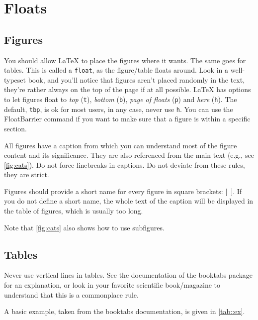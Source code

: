 \documentclass[{{cookiecutter.project_slug}}.tex]{subfiles}
\begin{document}
    \section{Floats}
    \subsection{Figures}
    You should  allow \LaTeX{} to place  the figures where it  wants.  The 
    same  goes  for  tables.   This  is  called  a  \verb+float+,  as  the 
    figure/table floats around.   Look in a well-typeset  book, and you'll 
    notice that figures aren't placed randomly in the text, they're rather 
    always  on the  top  of  the page  if  at  all possible. \LaTeX{}  has 
    options to  let figures float to  \emph{top} (\verb+t+), \emph{bottom} 
    (\verb+b+),   \emph{page  of   floats}   (\verb+p+)  and   \emph{here} 
    (\verb+h+).  The  default, \verb+tbp+, is  ok for most users,  in any 
    case, never use \verb+h+.  You can use the FloatBarrier command if you 
    want to make sure that a figure is within a specific section.          

    All figures have  a caption from which you can  understand most of the 
    figure content  and its significance.   They are also  referenced from 
    the main text (e.g., see \cref{fig:cats}).  Do not force linebreaks in 
    captions.  Do not deviate from these rules, they are strict.           

    Figures  should  provide a  short  name  for  every figure  in  square 
    brackets: $[$~$]$. If  you do not define a short  name, the whole text 
    of the caption will be displayed in the table of figures, which is 
    usually too long.
    
    Note that \cref{fig:cats} also shows how to use subfigures.



    \subsection{Tables}
    Never  use vertical  lines in  tables.  See  the documentation  of the 
    booktabs  package  for  an  explanation,  or  look  in  your  favorite 
    scientific  book/magazine to  understand  that this  is a  commonplace 
    rule.                                                                  

    A basic  example, taken  from the booktabs  documentation, is  given in
    \cref{tab::ex}.
\end{document}
